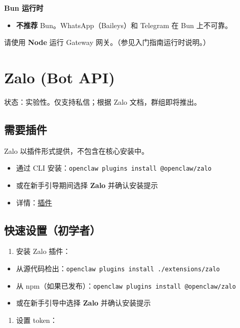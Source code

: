 \textbf{Bun 运行时}

\begin{itemize}
  \item \textbf{不推荐} Bun。WhatsApp（Baileys）和 Telegram 在 Bun 上不可靠。
\end{itemize}

请使用 \textbf{Node} 运行 Gateway 网关。（参见入门指南运行时说明。）


\clearpage

\section{Zalo (Bot API)}


状态：实验性。仅支持私信；根据 Zalo 文档，群组即将推出。

\subsection{需要插件}


Zalo 以插件形式提供，不包含在核心安装中。

\begin{itemize}
  \item 通过 CLI 安装：\texttt{openclaw plugins install @openclaw/zalo}
  \item 或在新手引导期间选择 \textbf{Zalo} 并确认安装提示
  \item 详情：\href{/tools/plugin}{插件}
\end{itemize}


\subsection{快速设置（初学者）}


\begin{enumerate}
  \item 安装 Zalo 插件：
\end{enumerate}

\begin{itemize}
  \item 从源代码检出：\texttt{openclaw plugins install ./extensions/zalo}
  \item 从 npm（如果已发布）：\texttt{openclaw plugins install @openclaw/zalo}
  \item 或在新手引导中选择 \textbf{Zalo} 并确认安装提示
\end{itemize}

\begin{enumerate}
  \item 设置 token：
\end{enumerate}

